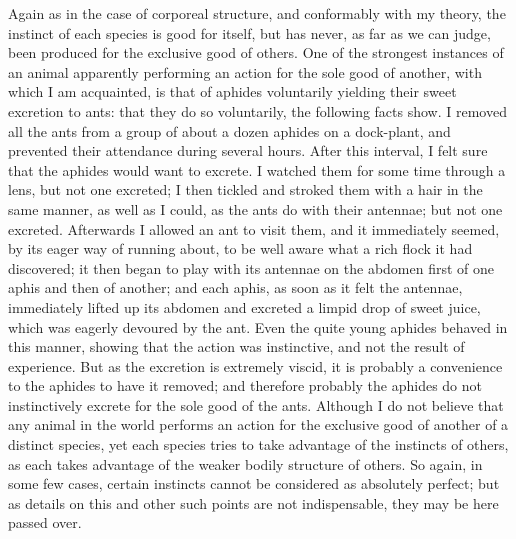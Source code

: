 Again as in the case of corporeal structure, and conformably with my theory, the instinct of each species is good for itself, but has never, as far as we can judge, been produced for the exclusive good of others. One of the strongest instances of an animal apparently performing an action for the sole good of another, with which I am acquainted, is that of aphides voluntarily yielding their sweet excretion to ants: that they do so voluntarily, the following facts show. I removed all the ants from a group of about a dozen aphides on a dock-plant, and prevented their attendance during several hours. After this interval, I felt sure that the aphides would want to excrete. I watched them for some time through a lens, but not one excreted; I then tickled and stroked them with a hair in the same manner, as well as I could, as the ants do with their antennae; but not one excreted. Afterwards I allowed an ant to visit them, and it immediately seemed, by its eager way of running about, to be well aware what a rich flock it had discovered; it then began to play with its antennae on the abdomen first of one aphis and then of another; and each aphis, as soon as it felt the antennae, immediately lifted up its abdomen and excreted a limpid drop of sweet juice, which was eagerly devoured by the ant. Even the quite young aphides behaved in this manner, showing that the action was instinctive, and not the result of experience. But as the excretion is extremely viscid, it is probably a convenience to the aphides to have it removed; and therefore probably the aphides do not instinctively excrete for the sole good of the ants. Although I do not believe that any animal in the world performs an action for the exclusive good of another of a distinct species, yet each species tries to take advantage of the instincts of others, as each takes advantage of the weaker bodily structure of others. So again, in some few cases, certain instincts cannot be considered as absolutely perfect; but as details on this and other such points are not indispensable, they may be here passed over.
